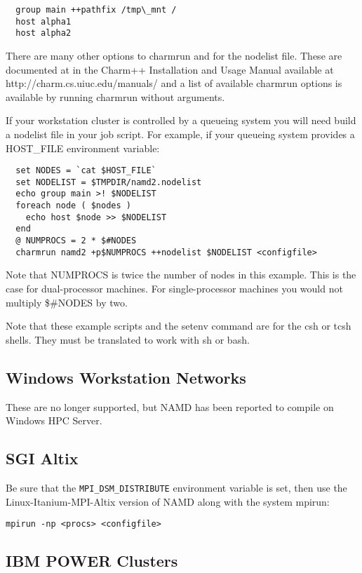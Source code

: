 \begin{verbatim}
  group main ++pathfix /tmp\_mnt /
  host alpha1
  host alpha2
\end{verbatim}

There are many other options to charmrun and for the nodelist file.
These are documented at in the Charm++ Installation and Usage Manual
available at http://charm.cs.uiuc.edu/manuals/ and a list of available
charmrun options is available by running charmrun without arguments.

If your workstation cluster is controlled by a queueing system you
will need build a nodelist file in your job script.  For example, if
your queueing system provides a HOST\_FILE environment variable:

\begin{verbatim}
  set NODES = `cat $HOST_FILE`
  set NODELIST = $TMPDIR/namd2.nodelist
  echo group main >! $NODELIST
  foreach node ( $nodes )
    echo host $node >> $NODELIST
  end
  @ NUMPROCS = 2 * $#NODES
  charmrun namd2 +p$NUMPROCS ++nodelist $NODELIST <configfile>
\end{verbatim}

Note that NUMPROCS is twice the number of nodes in this example.
This is the case for dual-processor machines.  For single-processor
machines you would not multiply \$\#NODES by two.

Note that these example scripts and the setenv command are for the csh
or tcsh shells.  They must be translated to work with sh or bash.

\subsection{Windows Workstation Networks}

These are no longer supported, but NAMD has been reported to compile
on Windows HPC Server.

\subsection{SGI Altix}

Be sure that the {\tt MPI\_DSM\_DISTRIBUTE} environment variable is set, then
use the Linux-Itanium-MPI-Altix version of NAMD along with the system mpirun:

\begin{verbatim}
mpirun -np <procs> <configfile>
\end{verbatim}

\subsection{IBM POWER Clusters}

